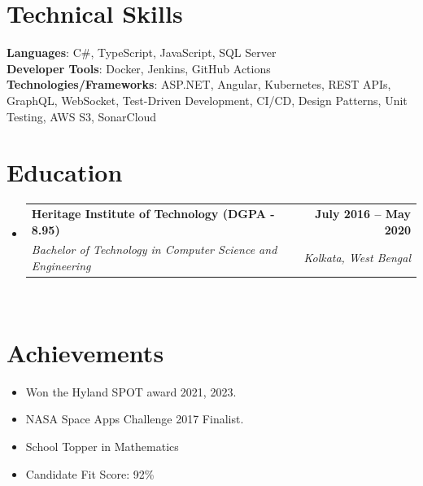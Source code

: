 \documentclass[letterpaper,11pt]{article}
\makeatletter
\newcommand{\resumeItem}[1]{
  \item\small{
    {#1 \vspace{-2pt}}
  }
}
\newcommand{\resumeSubheading}[4]{
  \vspace{-2pt}\item
    \begin{tabular*}{1.0\textwidth}[t]{l@{\extracolsep{\fill}}r}
      \textbf{#1} & \textbf{\small #2} \\
      \textit{\small#3} & \textit{\small #4} \\
    \end{tabular*}\vspace{-7pt}
}
\newcommand{\resumeSubItem}[1]{\resumeItem{#1}\vspace{-4pt}}
\newcommand{\resumeSubHeadingListStart}{\begin{itemize}[leftmargin=0.0in, label={}]}
\newcommand{\resumeSubHeadingListEnd}{\end{itemize}}
\newcommand{\resumeItemListStart}{\begin{itemize}}
\newcommand{\resumeItemListEnd}{\end{itemize}\vspace{-5pt}}
\makeatother
\begin{document}
\section{Technical Skills}
 \begin{itemize}[leftmargin=0.15in, label={}]
    \small{\item{
     \textbf{Languages}{: C\#, TypeScript, JavaScript, SQL Server} \\
     \textbf{Developer Tools}{: Docker, Jenkins, GitHub Actions} \\
     \textbf{Technologies/Frameworks}{: ASP.NET, Angular, Kubernetes, REST APIs, GraphQL, WebSocket, Test-Driven Development, CI/CD, Design Patterns, Unit Testing, AWS S3, SonarCloud} \\
    }}
 \end{itemize}
 \vspace{-16pt}

 
\section{Education}
  \resumeSubHeadingListStart
    \resumeSubheading
      {Heritage Institute of Technology (DGPA - 8.95) }{July 2016 -- May 2020}
      {Bachelor of Technology in Computer Science and Engineering} {Kolkata, West Bengal} \\
   
  \resumeSubHeadingListEnd

\section{Achievements}
    \resumeItemListStart
        \resumeSubItem{Won the Hyland SPOT award 2021, 2023.}
        \resumeSubItem{NASA Space Apps Challenge 2017 Finalist.}
        \resumeSubItem{School Topper in Mathematics}
        \resumeSubItem{Candidate Fit Score: 92\%}
    \resumeItemListEnd
\end{document}
